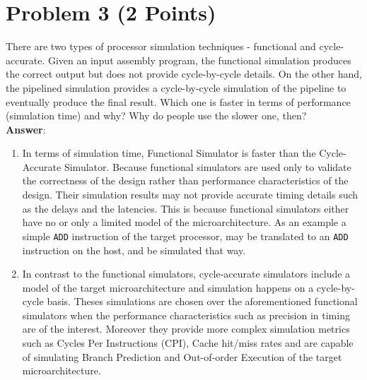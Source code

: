 \documentclass[11pt,letterpaper]{article}
\begin{document}
	
	\vspace{40mm}
	
	
	\section*{Problem 3 (2 Points)}
	
	There are two types of processor simulation techniques - functional and cycle-accurate. Given an input assembly program, the functional simulation produces the correct output but does not provide cycle-by-cycle  details. On  the  other  hand,  the  pipelined  simulation  provides  a cycle-by-cycle  simulation  of  the pipeline  to  eventually  produce  the  final  result. Which one  is  faster  in  terms  of  performance  (simulation time) and why? Why do people use the slower one, then?\\
	
	\textbf{\Large Answer}:
	\begin{enumerate}
		\item In terms of simulation time, Functional Simulator is faster than the Cycle-Accurate Simulator. Because functional simulators  are used only to validate the correctness of the design rather than performance characteristics of the design. Their simulation results may not provide accurate timing details such as the delays and the latencies. This is because functional simulators either have no or only a limited model of the microarchitecture. As an example a simple {\tt ADD} instruction of the target processor, may be translated to an {\tt ADD} instruction on the host, and be simulated that way.
		
		\item In contrast to the functional simulators, cycle-accurate simulators include a model of the target microarchitecture and simulation happens on a cycle-by-cycle basis. Theses  simulations are chosen over the aforementioned functional simulators when the performance characteristics such as precision in timing are of the interest. Moreover they provide more complex simulation metrics such as  Cycles Per Instructions (CPI), Cache hit/miss rates and are capable of simulating Branch Prediction and Out-of-order Execution of the target microarchitecture.
		
	\end{enumerate}
	
\end{document}
